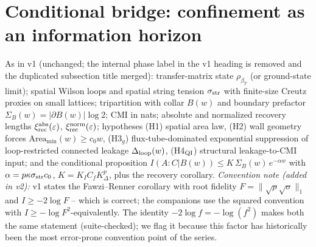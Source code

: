 \documentclass[11pt]{article}
\theoremstyle{remark}
\begin{document}
\section{Conditional bridge: confinement as an information horizon}
As in v1 (unchanged; the internal phase label in the v1 heading is
removed and the duplicated subsection title merged): transfer-matrix
state $\rho_{\beta_T}$ (or ground-state limit); spatial Wilson loops and
spatial string tension $\sigma_{\rm str}$ with finite-size Creutz proxies
on small lattices; tripartition with collar $B(w)$ and boundary prefactor
$\Sigma_B(w) = |\partial B(w)|\log 2$; CMI in nats; absolute and
normalized recovery lengths $\xi^{\rm abs}_{\rm rec}(\varepsilon)$,
$\xi^{\rm norm}_{\rm rec}(\varepsilon)$; hypotheses (H1) spatial area
law, (H2) wall geometry forces $\mathrm{Area}_{\min}(w) \ge c_0 w$,
(H3$_g$) flux-tube-dominated exponential suppression of loop-restricted
connected leakage $\Delta_{\rm loop}(w)$, (H4$_{\rm QI}$) structural
leakage-to-CMI input; and the conditional proposition
$I(A{:}C|B(w)) \le K\,\Sigma_B(w)\,e^{-\alpha w}$ with
$\alpha = p\kappa\sigma_{\rm str}c_0$, $K = K_I C_f K_\Delta^p$, plus the
recovery corollary. \emph{Convention note (added in v2):} v1 states the
Fawzi--Renner corollary with root fidelity $F = \|\sqrt\rho\sqrt\sigma
\|_1$ and $I \ge -2\log F$ -- which is correct; the companions use the
squared convention with $I \ge -\log F^2$-equivalently. The identity
$-2\log f = -\log(f^2)$ makes both the same statement (suite-checked);
we flag it because this factor has historically been the most
error-prone convention point of the series.
\end{document}
